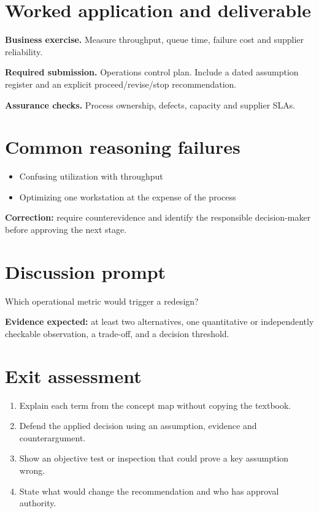 \documentclass[11pt,letterpaper]{article}
\begin{document}
\section{Worked application and deliverable}
\textbf{Business exercise.} Measure throughput, queue time, failure cost and supplier reliability.\par\textbf{Required submission.} Operations control plan. Include a dated assumption register and an explicit proceed/revise/stop recommendation.\par\textbf{Assurance checks.} Process ownership, defects, capacity and supplier SLAs.
\section{Common reasoning failures}
\begin{itemize}[leftmargin=*,itemsep=3pt]
\item Confusing utilization with throughput
\item Optimizing one workstation at the expense of the process
\end{itemize}
\noindent\textbf{Correction:} require counterevidence and identify the responsible decision-maker before approving the next stage.
\section{Discussion prompt}
Which operational metric would trigger a redesign?\par\medskip\textbf{Evidence expected:} at least two alternatives, one quantitative or independently checkable observation, a trade-off, and a decision threshold.
\section{Exit assessment}
\begin{enumerate}[leftmargin=*,itemsep=5pt]
\item Explain each term from the concept map without copying the textbook.
\item Defend the applied decision using an assumption, evidence and counterargument.
\item Show an objective test or inspection that could prove a key assumption wrong.
\item State what would change the recommendation and who has approval authority.
\end{enumerate}

\end{document}
